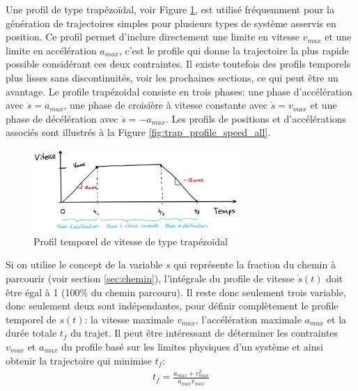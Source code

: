Une profil de type trapézoïdal, voir Figure \ref{fig:trap_profile_speed}, est utilisé fréquemment pour la génération de trajectoires simples pour plusieurs types de système asservis en position. Ce profil permet d'inclure directement une limite en vitesse $v_{max}$ et une limite en accélération $a_{max}$, c'est le profile qui donne la trajectoire la plus rapide possible considérant ces deux contraintes. Il existe toutefois des profils temporels plus lisses sans discontinuités, voir les prochaines sections, ce qui peut être un avantage. Le profile trapézoïdal consiste en trois phases: une phase d'accélération avec $\ddot{s} = a_{max}$, une phase de croisière à vitesse constante avec $\dot{s} = v_{max}$ et une phase de décélération avec $\ddot{s} = -a_{max}$. Les profils de positions et d'accélérations associés sont illustrés à la Figure \ref{fig:trap_profile_speed_all}. 
\begin{figure}[htbp]
	\centering
		\includegraphics[width=0.70\textwidth]{fig/trap_profile_speed.jpg}
	\caption{Profil temporel de vitesse de type trapézoïdal}
	\label{fig:trap_profile_speed}
\end{figure}

Si on utilise le concept de la variable $s$ qui représente la fraction du chemin à parcourir (voir section \ref{sec:chemin}), l'intégrale du profile de vitesse $\dot{s}(t)$ doit être égal à 1 (100\% du chemin parcouru). Il reste donc seulement trois variable, donc seulement deux sont indépendantes, pour définir complètement le profile temporel de $s(t)$: la vitesse maximale $v_{max}$, l'accélération maximale $a_{max}$ et la durée totale $t_f$ du trajet. Il peut être intéressant de déterminer les contraintes $v_{max}$ et $a_{max}$ du profile basé sur les limites physiques d'un système et ainsi obtenir la trajectoire qui minimise $t_f$:
\begin{align}
t_f = \frac{a_{max}+v_{max}^2}{a_{max} v_{max}} 
\end{align}

